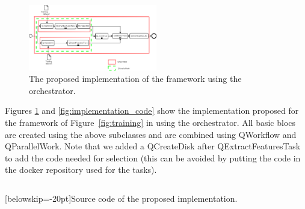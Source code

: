 \documentclass[10pt, conference, compsocconf]{IEEEtran}
\begin{document}
\begin{figure}[H]
\centering
\includegraphics[width=0.5\textwidth]{Figures/implementation.png}
\caption{The proposed implementation of the framework using the orchestrator.}
\label{fig:implementation_diagram}
\end{figure}

Figures \ref{fig:implementation_diagram} and \ref{fig:implementation_code} show the implementation proposed for the framework of Figure~\ref{fig:training} in using the orchestrator. All basic blocs are created using the above subclasses and are combined using QWorkflow and QParallelWork. Note that we added a QCreateDisk after QExtractFeaturesTask to add the code needed for selection (this can be avoided by putting the code in the docker repository used for the tasks).

\begin{mdframed}[backgroundcolor=LightGray,topline=false, bottomline=false,leftline=false, rightline=false]
\inputminted[baselinestretch=1, fontsize=\scriptsize]{python}{selection.py}
\end{mdframed}
[belowskip=-20pt]{Source code of the proposed implementation.}
\label{fig:implementation_code}
\end{document}
